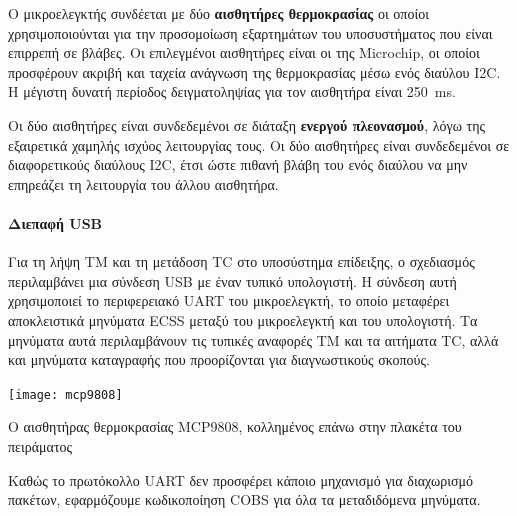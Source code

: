 \documentclass[a4paper,nobib]{tufte-book}
\begin{document}
Ο μικροελεγκτής συνδέεται με δύο \textbf{αισθητήρες θερμοκρασίας} οι οποίοι χρησιμοποιούνται για την προσομοίωση εξαρτημάτων του υποσυστήματος που είναι επιρρεπή σε βλάβες. Οι επιλεγμένοι αισθητήρες είναι οι  της Microchip, οι οποίοι προσφέρουν ακριβή και ταχεία ανάγνωση της θερμοκρασίας μέσω ενός διαύλου \ac{I2C}. Η μέγιστη δυνατή περίοδος δειγματοληψίας για τον αισθητήρα είναι \SI{250}{\milli\second}.


Οι δύο αισθητήρες είναι συνδεδεμένοι σε διάταξη \textbf{ενεργού πλεονασμού}, λόγω της εξαιρετικά χαμηλής ισχύος λειτουργίας τους. Οι δύο αισθητήρες είναι συνδεδεμένοι σε διαφορετικούς διαύλους \ac{I2C}, έτσι ώστε πιθανή βλάβη του ενός διαύλου να μην επηρεάζει τη λειτουργία του άλλου αισθητήρα.

\paragraph{Διεπαφή \acs{USB}} Για τη λήψη \acl{TM} και τη μετάδοση \acl{TC} στο υποσύστημα επίδειξης, ο σχεδιασμός περιλαμβάνει μια σύνδεση \acl{USB} με έναν τυπικό υπολογιστή. Η σύνδεση αυτή χρησιμοποιεί το περιφερειακό \acs{UART} του μικροελεγκτή, το οποίο μεταφέρει αποκλειστικά μηνύματα \acs{ECSS} μεταξύ του μικροελεγκτή και του υπολογιστή. Τα μηνύματα αυτά περιλαμβάνουν τις τυπικές αναφορές \acs{TM} και τα αιτήματα \acs{TC}, αλλά και μηνύματα καταγραφής που προορίζονται για διαγνωστικούς σκοπούς.

\begin{marginfigure}
	\texttt{[image: mcp9808]}
	\caption{Ο αισθητήρας θερμοκρασίας MCP9808, κολλημένος επάνω στην πλακέτα του πειράματος}
\end{marginfigure}

Καθώς το πρωτόκολλο \acs{UART} δεν προσφέρει κάποιο μηχανισμό για διαχωρισμό πακέτων, εφαρμόζουμε κωδικοποίηση \acs{COBS} \autocite{cheshire_consistent_overhead_1997} για όλα τα μεταδιδόμενα μηνύματα.
\end{document}
